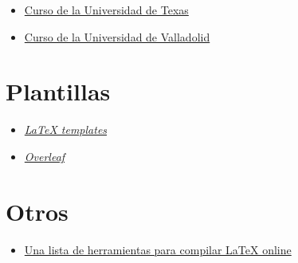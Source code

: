 \begin{itemize}
\item
  \href{http://www.math.tamu.edu/~boas/courses/math696/LaTeX.html}{Curso
  de la Universidad de Texas}
\item
  \href{http://metodos.fam.cie.uva.es/~latex/apuntes/apuntes.html}{Curso
  de la Universidad de Valladolid}
\end{itemize}

\section{Plantillas}

\begin{itemize}
\item
  \href{http://www.latextemplates.com/}{\emph{LaTeX templates}}
\item
  \href{https://www.overleaf.com/}{\emph{Overleaf}}
\end{itemize}

\section{Otros}

\begin{itemize}
\item
  \href{https://tex.stackexchange.com/questions/3/compiling-documents-online}{Una
  lista de herramientas para compilar LaTeX online}
\end{itemize}
